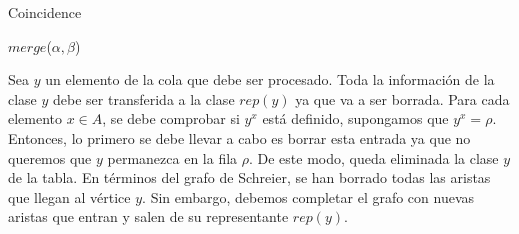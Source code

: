 \begin{center}
\begin{minipage}{.7\linewidth}
    \begin{algorithm}[H] 
    \SetAlgoLined
    	\caption{Coincidence}
    	\KwData{ $\alpha, \beta \in \Omega$ }

    	    $merge$($\alpha, \beta$) \\
    	
    \end{algorithm} 
\end{minipage}
\end{center}

Sea $y$ un elemento de la cola que debe ser procesado. Toda la información de la clase $y$ debe ser transferida a la clase $rep(y)$ ya que va a ser borrada. Para cada elemento $x \in A$, se debe comprobar si $y^x$ está definido, supongamos que $y^x=\rho$. Entonces, lo primero se debe llevar a cabo es borrar esta entrada ya que no queremos que $y$ permanezca en la fila $\rho$. De este modo, queda eliminada la clase $y$ de la tabla. En términos del grafo de Schreier, se han borrado todas las aristas que llegan al vértice $y$. Sin embargo, debemos completar el grafo con nuevas aristas que entran y salen de su representante $rep(y)$.


